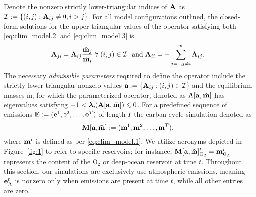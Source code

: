 \documentclass[11pt, a4paper, pdftex, twoside, dvipsnames]{article}
\renewcommand{\ref}{\cref}
\newcommand{\bb}[1]{\boldsymbol{\bold{#1}}}
\newcommand{\bbt}[1]{\tilde{\boldsymbol{\mathrm{#1}}}}
\newcommand{\ameq}[0]{\bb{a},\bbt{m}}
\begin{document}
Denote the nonzero strictly lower-triangular indices of $\bb{A}$ as $\mathcal{I}:=\{(i,j):\bb{A}_{ij}\neq 0,i>j\}$.
%
For all model configurations outlined, the closed-form solutions for the upper triangular values of the operator satisfying both \eqref{eq:clim_model.2} and \eqref{eq:clim_model.3} is
%
\begin{align} \label{eq:clim_model.4}
	\bb{A}_{ji} = \bb{A}_{ij}  \frac{\bbt{m}_j}{\bbt{m}_i} \; \forall \; (i,j) \in \mathcal{I}, \; \text{and} \;  \bb{A}_{ii}= -\sum_{j=1,j\neq i}^p \bb{A}_{ij}.
\end{align}
%
The necessary \emph{admissible parameters} required to define the operator include the strictly lower triangular nonzero values $\bb{a}:=\{ \bb{A}_{ij}: (i,j) \in \mathcal{I} \}$ and the equilibrium masses $\bbt{m}$, for which the parameterized operator, denoted as $\bb{A}[\ameq]$ has eigenvalues satisfying $-1 < \bb{\lambda}_i(\bb{A}[\ameq]) \leqslant 0$.
%
For a predefined sequence of emissions $\bb{E}:=(\bb{e}^{1},\bb{e}^{2},\ldots,\bb{e}^T)$ of length $T$ the carbon-cycle simulation denoted as    
%
\begin{align} \label{eq:clim_model.5}
	\bb{M}[\ameq] := (\bb{m}^{1},\bb{m}^{2},\ldots,\bb{m}^{T} ), 
\end{align}
%
where $\bb{m}^{t}$ is defined as per \eqref{eq:clim_model.1}. 
%
We utilize acronyms depicted in Figure~\ref{fig:1} to refer to specific reservoirs; for instance, $\bb{M}[\ameq]^{t}_{\text{O}_2}=\bb{m}^t_{\text{O}_2}$ represents the content of the $\text{O}_2$ or deep-ocean reservoir at time $t$.
%
Throughout this section, our simulations are exclusively use atmospheric emissions, meaning $\bb{e}_{\text{A}}^t$ is nonzero only when emissions are present at time $t$, while all other entries are zero.
%
%
%
\end{document}
